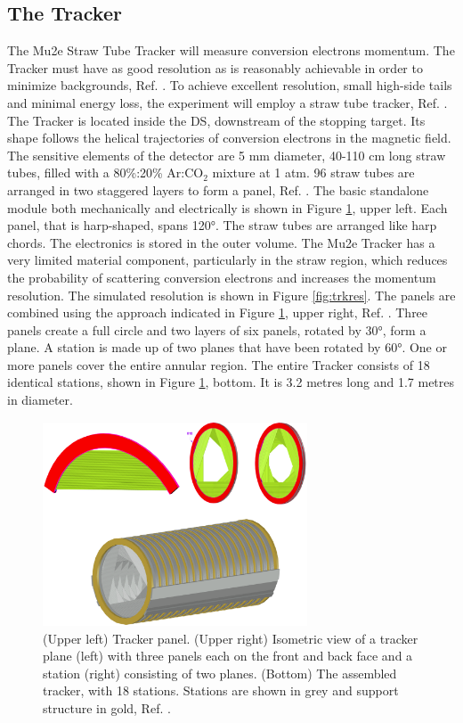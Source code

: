 \subsection{The Tracker}\label{trackersec}
The Mu2e Straw Tube Tracker will measure conversion electrons momentum.
The Tracker must have as good resolution as is reasonably achievable
in order to minimize backgrounds, Ref. \cite{bobbb}.
To achieve excellent resolution, small high-side tails and minimal energy loss, the experiment 
will employ a straw tube tracker, Ref. \cite{bobbb}.
The Tracker is located inside the DS, downstream of the stopping target. 
Its shape follows the helical trajectories of conversion electrons 
in the magnetic field. The sensitive elements of the detector are 5 mm diameter, 
40-110 cm long straw tubes, filled with a 80\%:20\% Ar:CO$_2$ mixture at 1 atm. 96 straw tubes are arranged in 
two staggered layers to form a panel, Ref. \cite{bartoszek2015mu2e}. 
The basic standalone module both mechanically and electrically is 
shown in Figure \ref{fig:trkpanel}, upper left. Each panel, that is 
harp-shaped, spans 120°. The straw tubes are arranged like harp chords. 
The electronics is stored in the outer volume. The Mu2e Tracker has a 
very limited material component, particularly in the straw region, 
which reduces the probability of scattering conversion electrons 
and increases the momentum resolution. The simulated resolution is shown in Figure \ref{fig:trkres}. 
The panels are combined 
using the approach indicated in Figure \ref{fig:trkpanel}, upper right, 
Ref. \cite{trk}. Three panels create a full circle and two layers of six 
panels, rotated by 30°, form a plane. A station is made up of two planes 
that have been rotated by 60°. One or more panels cover the entire annular 
region. The entire Tracker consists of 18 identical stations, shown in 
Figure \ref{fig:trkpanel}, bottom. It is 3.2 metres long and 1.7 metres in diameter. 
\begin{figure}[!h]
\centering
\includegraphics[width =0.7\textwidth]{figures/png/Screenshot_20240306_222803.png}
\caption{(Upper left) Tracker panel. (Upper right) Isometric view 
of a tracker plane (left) with three panels each on the front and 
back face and a station (right) consisting of two planes. (Bottom) 
The assembled tracker, with 18 stations. Stations are shown in 
grey and support structure in gold, Ref. \cite{bartoszek2015mu2e}.}
\label{fig:trkpanel}
\end{figure}
